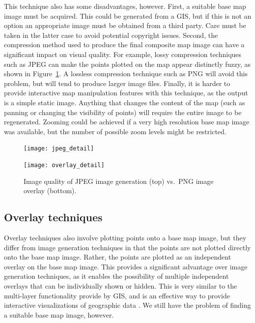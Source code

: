 \documentclass[acmtocl,acmnow]{acmtrans2m}
\begin{document}
This technique also has some disadvantages, however. First, a suitable
base map image must be acquired. This could be generated from a GIS, but
if this is not an option an appropriate image must be obtained from a
third party. Care must be taken in the latter case to avoid potential
copyright issues. Second, the compression method used to produce the
final composite map image can have a significant impact on visual
quality. For example, lossy compression techniques such as JPEG can make
the points plotted on the map appear distinctly fuzzy, as shown in
Figure~\ref{fig-image-quality}. A lossless compression technique such as
PNG will avoid this problem, but will tend to produce larger image
files. Finally, it is harder to provide interactive map manipulation
features with this technique, as the output is a simple static image.
Anything that changes the content of the map (such as panning or
changing the visibility of points) will require the entire image to be
regenerated. Zooming could be achieved if a very high resolution base
map image was available, but the number of possible zoom levels might be
restricted.


\begin{figure}
	\begin{center}
		\texttt{[image: jpeg\_detail]}\medskip
		
		\texttt{[image: overlay\_detail]}
	\end{center}
	\caption{Image quality of JPEG image generation (top) vs.\ PNG image
	overlay (bottom).}
	\label{fig-image-quality}
\end{figure}


\subsection{Overlay techniques}
\label{sec-overlay}


Overlay techniques also involve plotting points onto a base map image,
but they differ from image generation techniques in that the points are
not plotted directly onto the base map image. Rather, the points are
plotted as an independent overlay on the base map image. This provides a
significant advantage over image generation techniques, as it enables
the possibility of multiple independent overlays that can be
individually shown or hidden. This is very similar to the multi-layer
functionality provide by GIS, and is an effective way to provide
interactive visualizations of geographic data
\cite{Wood-J-1996-vis,MacE-AM-1998-GIS}. We still have the problem of
finding a suitable base map image, however.
\end{document}
